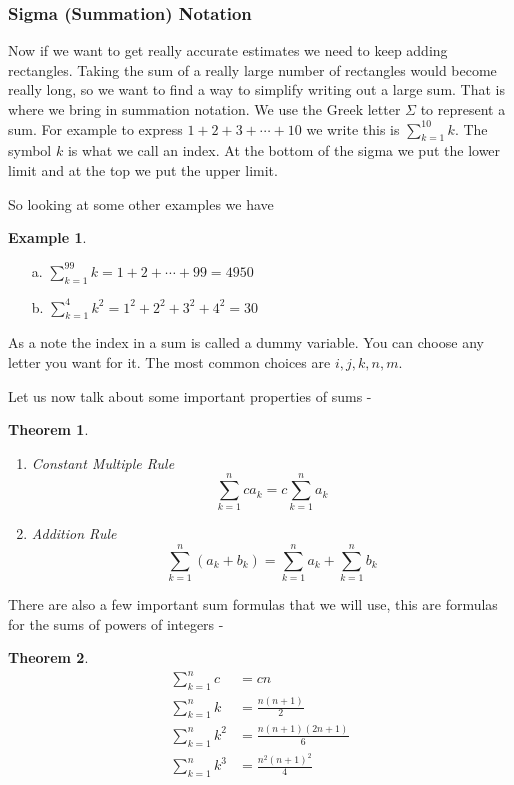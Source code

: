 \documentclass[12pt,reqno]{article}
\newtheorem{Theorem}{Theorem}
\theoremstyle{definition}
\newtheorem*{Example}{Example}
\begin{document}
\subsubsection{Sigma (Summation) Notation} 

Now if we want to get really accurate estimates we need to keep adding rectangles. Taking the sum of a really large number of rectangles would become really long, so we want to find a way to simplify writing out a large sum. That is where we bring in summation notation. We use the Greek letter $\Sigma$ to represent a sum. For example to express $1 + 2 + 3 + \cdots + 10$ we write this is $\sum_{k = 1}^{10} k $. The symbol $k$ is what we call an index. At the bottom of the sigma we put the lower limit and at the top we put the upper limit. 

So looking at some other examples we have 
\begin{Example}
	\begin{enumerate}
		\item[a.] $\sum_{k = 1}^{99} k = 1 + 2 + \cdots + 99 = 4950$ 
		\item[b.] $\sum_{ k = 1}^{4} k^2 = 1^2 + 2^2 + 3^2 + 4^2 = 30$ 
	\end{enumerate}
\end{Example}

As a note the index in a sum is called a dummy variable. You can choose any letter you want for it. The most common choices are $i, j, k, n, m$. 

Let us now talk about some important properties of sums - 
\begin{Theorem}
	\begin{enumerate}
		\item Constant Multiple Rule $$\sum_{k = 1}^{n} c a_k = c \sum_{k = 1}^{n} a_k$$ 
		\item Addition Rule $$\sum_{k = 1}^{n} (a_k + b_k) = \sum_{k = 1}^{n} a_k + \sum_{k = 1}^{n} b_k$$
	\end{enumerate}
\end{Theorem}

There are also a few important sum formulas that we will use, this are formulas for the sums of powers of integers -
\begin{Theorem}
	\begin{align*}
		\sum_{k = 1}^{n} c &= cn \\
		\sum_{k = 1}^{n} k &= \frac{n(n + 1)}{2} \\
		\sum_{k = 1}^{n} k^2 &= \frac{n(n + 1)(2n + 1)}{6} \\
		\sum_{k = 1}^{n} k^3 &= \frac{n^2 (n + 1)^2}{4}
	\end{align*}
\end{Theorem}
\end{document}
